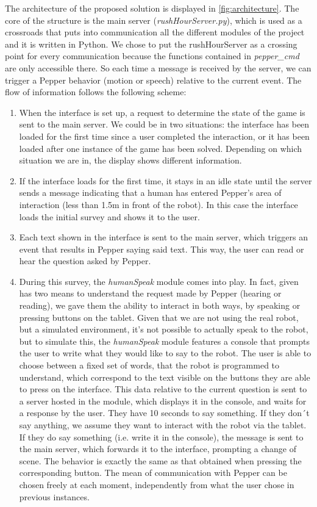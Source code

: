 \documentclass{article}
\begin{document}
The architecture of the proposed solution is displayed in \ref{fig:architecture}. The core of the structure is the main server (\textit{rushHourServer.py}), which is used as a crossroads that puts into communication all the different modules of the project and it is written in Python. We chose to put the rushHourServer as a crossing point for every communication because the functions contained in \textit{pepper\_cmd} are only accessible there. So each time a message is received by the server, we can trigger a Pepper behavior (motion or speech) relative to the current event. The flow of information follows the following scheme:

\begin{enumerate}
    \item When the interface is set up, a request to determine the state of the game is sent to the main server. We could be in two situations: the interface has been loaded for the first time since a user completed the interaction, or it has been loaded after one instance of the game has been solved. Depending on which situation we are in, the display shows different information.
    \item If the interface loads for the first time, it stays in an idle state until the server sends a message indicating that a human has entered Pepper's area of interaction (less than 1.5m in front of the robot). In this case the interface loads the initial survey and shows it to the user.
    \item Each text shown in the interface is sent to the main server, which triggers an event that results in Pepper saying said text. This way, the user can read or hear the question asked by Pepper.
    \item During this survey, the \textit{humanSpeak} module comes into play. In fact, given has two means to understand the request made by Pepper (hearing or reading), we gave them the ability to interact in both ways, by speaking or pressing buttons on the tablet. Given that we are not using the real robot, but a simulated environment, it's not possible to actually speak to the robot, but to simulate this, the \textit{humanSpeak} module features a console that prompts the user to write what they would like to say to the robot. The user is able to choose between a fixed set of words, that the robot is programmed to understand, which correspond to the text visible on the buttons they are able to press on the interface. This data relative to the current question is sent to a server hosted in the module, which displays it in the console, and waits for a response by the user. They have 10 seconds to say something. If they don´t say anything, we assume they want to interact with the robot via the tablet. If they do say something (i.e. write it in the console), the message is sent to the main server, which forwards it to the interface, prompting a change of scene. The behavior is exactly the same as that obtained when pressing the corresponding button. The mean of communication with Pepper can be chosen freely at each moment, independently from what the user chose in previous instances. 

\end{enumerate}
\end{document}
